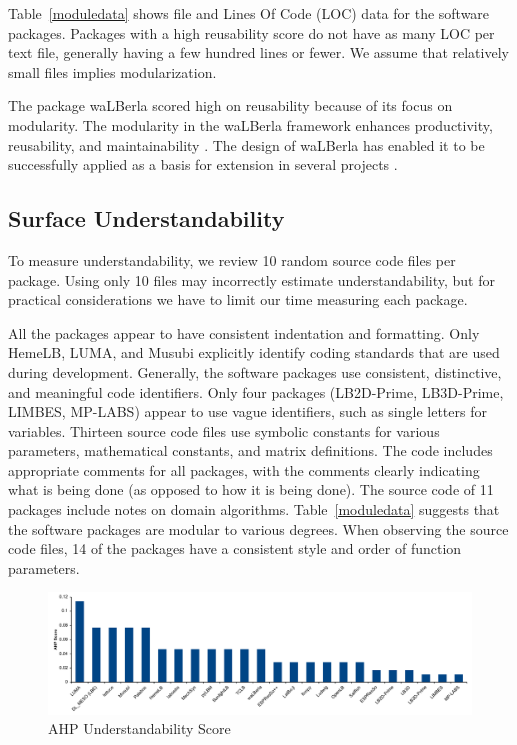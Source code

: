 \documentclass[final, 3p, times, authoryear]{elsarticle}
\begin{document}
Table~\ref{moduledata} shows file and Lines Of Code (LOC) data for the software
packages. Packages with a high reusability score do not have as many LOC per
text file, generally having a few hundred lines or fewer. We assume that
relatively small files implies modularization.

The package waLBerla scored high on reusability because of its focus on
modularity.  The modularity in the waLBerla framework enhances productivity,
reusability, and maintainability \citep{bauer2021walberla}. The design of
waLBerla has enabled it to be successfully applied as a basis for extension in
several projects \citep{bauer2021walberla}.

\subsection{Surface Understandability} \label{Sec_SurfUnderstandability}

To measure understandability, we review 10 random source code files per package.
Using only 10 files may incorrectly estimate understandability, but for
practical considerations we have to limit our time measuring each package.

All the packages appear to have consistent indentation and formatting. Only
HemeLB, LUMA, and Musubi explicitly identify coding standards that are used
during development. Generally, the software packages use consistent,
distinctive, and meaningful code identifiers. Only four packages (LB2D-Prime,
LB3D-Prime, LIMBES, MP-LABS) appear to use vague identifiers, such as single
letters for variables. Thirteen source code files use symbolic constants for
various parameters, mathematical constants, and matrix definitions. The code
includes appropriate comments for all packages, with the comments clearly
indicating what is being done (as opposed to how it is being done). The source
code of 11 packages include notes on domain algorithms. Table~\ref{moduledata}
suggests that the software packages are modular to various degrees. When
observing the source code files, 14 of the packages have a consistent style and
order of function parameters.

\begin{figure}[h!]
	\begin{center}
		\includegraphics[width=1.0\textwidth]{./figures/understandability_chart.pdf}
		\caption{AHP Understandability Score}
		\label{Fig_Understandability}
	\end{center}
\end{figure}
\end{document}
